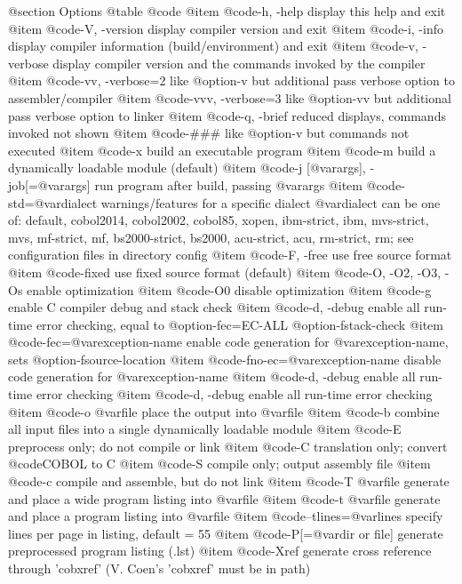 @section Options
@table @code
@item @code{-h, -help}
display this help and exit
@item @code{-V, -version}
display compiler version and exit
@item @code{-i, -info}
display compiler information (build/environment)
and exit
@item @code{-v, -verbose}
display compiler version and the commands
invoked by the compiler
@item @code{-vv, -verbose=2}
like @option{-v} but additional pass verbose option
to assembler/compiler
@item @code{-vvv, -verbose=3}
like @option{-vv} but additional pass verbose option
to linker
@item @code{-q, -brief}
reduced displays, commands invoked not shown
@item @code{-###}
like @option{-v} but commands not executed
@item @code{-x}
build an executable program
@item @code{-m}
build a dynamically loadable module (default)
@item @code{-j [@var{args}], -job[=@var{args}]}
run program after build, passing @var{args}
@item @code{-std=@var{dialect}}
warnings/features for a specific dialect
@var{dialect} can be one of:
default, cobol2014, cobol2002, cobol85, xopen,
ibm-strict, ibm, mvs-strict, mvs,
mf-strict, mf, bs2000-strict, bs2000,
acu-strict, acu, rm-strict, rm;
see configuration files in directory config
@item @code{-F, -free}
use free source format
@item @code{-fixed}
use fixed source format (default)
@item @code{-O, -O2, -O3, -Os}
enable optimization
@item @code{-O0}
disable optimization
@item @code{-g}
enable C compiler debug and stack check
@item @code{-d, -debug}
enable all run-time error checking,
equal to @option{-fec}=EC-ALL @option{-fstack-check}
@item @code{-fec=@var{exception-name}}
enable code generation for @var{exception-name},
sets @option{-fsource-location}
@item @code{-fno-ec=@var{exception-name}}
disable code generation for @var{exception-name}
@item @code{-d, -debug}
enable all run-time error checking
@item @code{-d, -debug}
enable all run-time error checking
@item @code{-o @var{file}}
place the output into @var{file}
@item @code{-b}
combine all input files into a single
dynamically loadable module
@item @code{-E}
preprocess only; do not compile or link
@item @code{-C}
translation only; convert @code{COBOL} to C
@item @code{-S}
compile only; output assembly file
@item @code{-c}
compile and assemble, but do not link
@item @code{-T @var{file}}
generate and place a wide program listing into @var{file}
@item @code{-t @var{file}}
generate and place a program listing into @var{file}
@item @code{--tlines=@var{lines}}
specify lines per page in listing, default = 55
@item @code{-P[=@var{dir or file}]}
generate preprocessed program listing (.lst)
@item @code{-Xref}
generate cross reference through 'cobxref'
(V. Coen's 'cobxref' must be in path)
